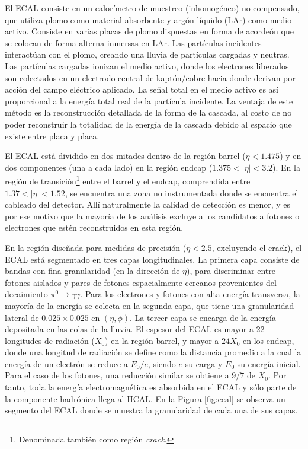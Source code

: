 El ECAL consiste en un calorímetro de muestreo (inhomogéneo) no compensado, que utiliza plomo como material absorbente y argón líquido (LAr) como medio activo. Consiste en varias placas de plomo dispuestas en forma de acordeón que se colocan de forma alterna inmersas en LAr. Las partículas incidentes interactúan con el plomo, creando una lluvia de partículas cargadas y neutras. Las partículas cargadas ionizan el medio activo, donde los electrones liberados son colectados en un electrodo central de kaptón/cobre hacia donde derivan por acción del campo eléctrico aplicado. La señal total en el medio activo es así proporcional a la energía total real de la partícula incidente. La ventaja de este método es la reconstrucción detallada de la forma de la cascada, al costo de no poder reconstruir la totalidad de la energía de la cascada debido al espacio que existe entre placa y placa.


El ECAL está dividido en dos mitades dentro de la región barrel ($\eta < 1.475$) y en dos componentes (una a cada lado) en la región endcap ($1.375 < |\eta| < 3.2$). 
En la región de transición\footnote{Denominada también como región \textit{crack}.} entre el barrel y el endcap, comprendida entre $1.37 < |\eta| < 1.52$, se encuentra una zona no instrumentada donde se encuentra el cableado del detector. 
Allí naturalmente la calidad de detección es menor, y es por ese motivo que la mayoría de los análisis excluye a los candidatos a fotones o electrones que estén reconstruidos en esta región.

En la región diseñada para medidas de precisión ($\eta < 2.5$, excluyendo el crack),
el ECAL está segmentado en tres capas longitudinales. La primera capa consiste de
bandas con fina granularidad (en la dirección de $\eta$), para discriminar entre fotones
aislados y pares de fotones espacialmente cercanos provenientes del decaimiento
$\pi^0\to\gamma\gamma$. Para los electrones y fotones con alta energía transversa, la mayoría
de la energía se colecta en la segunda capa, que tiene una granularidad lateral de
$0.025 \times 0.025$ en $(\eta, \phi)$. La tercer capa se encarga de la energía depositada en las
colas de la lluvia.
El espesor del ECAL es mayor a 22 longitudes de radiación ($X_0$) en la región
barrel, y mayor a $24X_0$ en los endcap, donde una longitud de radiación se define
como la distancia promedio a la cual la energía de un electrón se reduce a $E_0/e$, siendo $e$ su carga y $E_0$ su energía inicial. Para el caso de los fotones, una reducción similar se obtiene a
$9/7$ de $X_0$. Por tanto, toda la energía electromagnética es absorbida en el ECAL y
sólo parte de la componente hadrónica llega al HCAL. En la Figura \ref{fig:ecal} se observa un segmento del ECAL donde se muestra la granularidad de cada una de sus capas.

